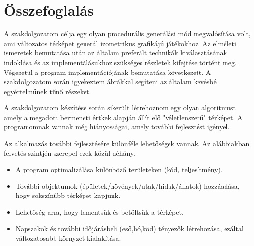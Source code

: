 \chapter{Összefoglalás}

A szakdolgozatom célja egy olyan procedurális generálási mód megvalósítása volt, ami változatos térképet generál izometrikus grafikájú játékokhoz. Az elméleti ismeretek bemutatása után az általam preferált technikák kiválasztásának indoklása és az implementálásukhoz szükséges részletek kifejtése történt meg. Végezetül a program implementációjának bemutatása következett. A szakdolgozatom során igyekeztem ábrákkal segíteni az általam kevésbé egyértelműnek tűnő részeket. 

\bigskip

\noindent A szakdolgozatom készítése során sikerült létrehoznom egy olyan algoritmust amely a megadott bermeneti értkek alapján állít elő "véletlenszerű" térképet. A programomnak vannak még hiányosságai, amely további fejlesztést igényel.

\bigskip

\noindent Az alkalmazás további fejlesztésére különféle lehetőségek vannak. Az alábbiakban felvetés szintjén szerepel ezek közül néhány.
\begin{itemize}
\item A program optimalizálása különböző területeken (kód, teljesítmény).
\item További objektumok (épületek/növények/utak/hidak/állatok) hozzáadása, hogy sokszínűbb térképet kapjunk.
\item Lehetőség arra, hogy lementsük és betöltsük a térképet.
\item Napszakok és további időjárásbeli (eső,hó,köd) tényezők létrehozása, ezáltal változatosabb környzet kialakítása. 
\end{itemize}
